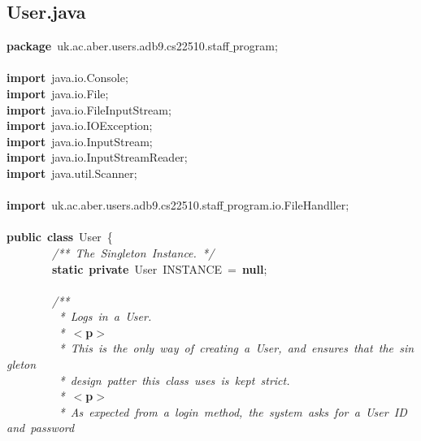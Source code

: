 \clearpage
\normalsize
\rmfamily
\subsection{User.java}
\scriptsize
\sffamily
\noindent
\mbox{}\textbf{package}\ uk.ac.aber.users.adb9.cs22510.staff$\_$program; \\
\mbox{} \\
\mbox{}\textbf{import}\ java.io.Console; \\
\mbox{}\textbf{import}\ java.io.File; \\
\mbox{}\textbf{import}\ java.io.FileInputStream; \\
\mbox{}\textbf{import}\ java.io.IOException; \\
\mbox{}\textbf{import}\ java.io.InputStream; \\
\mbox{}\textbf{import}\ java.io.InputStreamReader; \\
\mbox{}\textbf{import}\ java.util.Scanner; \\
\mbox{} \\
\mbox{}\textbf{import}\ uk.ac.aber.users.adb9.cs22510.staff$\_$program.io.FileHandller; \\
\mbox{} \\
\mbox{}\textbf{public}\ \textbf{class}\ User\ \{ \\
\mbox{}\ \ \ \ \ \ \ \ \textit{/**\ The\ Singleton\ Instance.\ */} \\
\mbox{}\ \ \ \ \ \ \ \ \textbf{static}\ \textbf{private}\ User\ INSTANCE\ =\ \textbf{null}; \\
\mbox{}\ \ \ \ \ \ \ \  \\
\mbox{}\ \ \ \ \ \ \ \ \textit{/**} \\
\mbox{}\textit{\ \ \ \ \ \ \ \ \ *\ Logs\ in\ a\ User.} \\
\mbox{}\textit{\ \ \ \ \ \ \ \ \ *\ }\textbf{$<$p$>$} \\
\mbox{}\textit{\ \ \ \ \ \ \ \ \ *\ This\ is\ the\ only\ way\ of\ creating\ a\ User,\ and\ ensures\ that\ the\ singleton} \\
\mbox{}\textit{\ \ \ \ \ \ \ \ \ *\ design\ patter\ this\ class\ uses\ is\ kept\ strict.} \\
\mbox{}\textit{\ \ \ \ \ \ \ \ \ *\ }\textbf{$<$p$>$} \\
\mbox{}\textit{\ \ \ \ \ \ \ \ \ *\ As\ expected\ from\ a\ login\ method,\ the\ system\ asks\ for\ a\ User\ ID\ and\ password} \\
